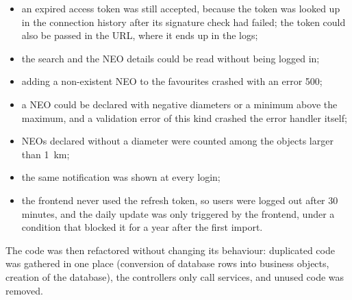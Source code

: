 \begin{itemize}
  \item an expired access token was still accepted, because the token was looked up in the
  connection history after its signature check had failed; the token could also be passed in the
  URL, where it ends up in the logs;
  \item the search and the NEO details could be read without being logged in;
  \item adding a non-existent NEO to the favourites crashed with an error 500;
  \item a NEO could be declared with negative diameters or a minimum above the maximum, and a
  validation error of this kind crashed the error handler itself;
  \item NEOs declared without a diameter were counted among the objects larger than 1~km;
  \item the same notification was shown at every login;
  \item the frontend never used the refresh token, so users were logged out after 30 minutes, and
  the daily update was only triggered by the frontend, under a condition that blocked it for a
  year after the first import.
\end{itemize}

The code was then refactored without changing its behaviour: duplicated code was gathered in one
place (conversion of database rows into business objects, creation of the database), the
controllers only call services, and unused code was removed.
